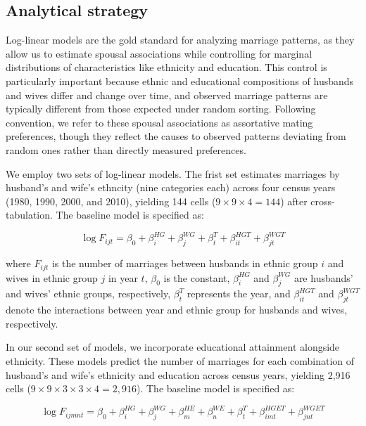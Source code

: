 
\subsection{Analytical strategy}

Log-linear models are the gold standard for analyzing marriage patterns, as they
allow us to estimate spousal associations while controlling for marginal
distributions of characteristics like ethnicity and education.
This control is particularly important because ethnic and educational
compositions of husbands and wives differ and change over time, and observed
marriage patterns are typically different from those expected under random
sorting.
Following convention, we refer to these spousal associations as assortative
mating preferences, though they reflect the causes to observed patterns
deviating from random ones rather than directly measured preferences.

We employ two sets of log-linear models.
The frist set estimates marriages by husband's and wife's ethncity (nine categories each)
across four census years (1980, 1990, 2000, and 2010), yielding 144 cells
($9 \times 9 \times 4 = 144$) after cross-tabulation.
The baseline model is specified as:

\begin{equation}
    \log F_{ijt} = \beta_0 + \beta_i^{HG} + \beta_j^{WG} + \beta_t^T + \beta_{it}^{HGT} + \beta_{jt}^{WGT}
\end{equation}

\noindent where $F_{ijt}$ is the number of marriages between husbands in ethnic
group $i$ and wives in ethnic group $j$ in year $t$,
$\beta_0$ is the constant,
$\beta_i^{HG}$ and $\beta_j^{WG}$ are husbands' and wives' ethnic groups,
respectively,
$\beta_t^T$ represents the year,
and $\beta_{it}^{HGT}$ and $\beta_{jt}^{WGT}$ denote the interactions between
year and ethnic group for husbands and wives, respectively.

In our second set of models, we incorporate educational attainment alongside
ethnicity.
These models predict the number of marriages for each combination of husband's
and wife's ethnicity and education across census years, yielding 2,916 cells
($9 \times 9 \times 3 \times 3 \times 4 = 2,916$).
The baseline model is specified as:

\begin{equation}
    \log F_{ijmnt} = \beta_0 + \beta_i^{HG} + \beta_j^{WG} + \beta_m^{HE} + \beta_n^{WE} +
    \beta_t^T + \beta_{imt}^{HGET} + \beta_{jnt}^{WGET}
\end{equation}


